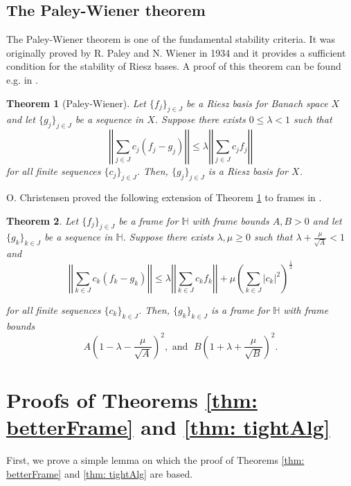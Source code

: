 \documentclass[11pt, reqno]{amsart}
\newcommand{\norm}[1]{\left|\left| #1 \right|\right|}
\newtheorem{theorem}{Theorem}[section]
\numberwithin{equation}{section}
\begin{document}
\subsection{The Paley-Wiener theorem} 

The Paley-Wiener theorem is one of the fundamental stability criteria. It was originally proved by R. Paley and N. Wiener in 1934 and it provides a sufficient condition for the stability of Riesz bases. A proof of this theorem can be found e.g. in \cite[Theorem 10]{Young}.

\begin{theorem}[Paley-Wiener]\label{thm:PWclassically}
    Let $\{f_j\}_{j \in J}$ be a Riesz basis for Banach space $X$ and let $\{g_j\}_{j \in J}$ be a sequence in $X$. Suppose there exists $0\le \lambda<1$ such that \begin{equation}
        \norm{\sum_{j \in J}c_j(f_j-g_j)}\le \lambda\norm{\sum_{j \in J}c_jf_j}
    \end{equation}
    for all finite sequences $\{c_j\}_{j \in J}$. Then, $\{g_j\}_{j \in J}$ is a Riesz basis for $X$.
\end{theorem}


\noindent O. Christensen proved the following extension of Theorem \ref{thm:PWclassically} to frames in \cite{Christensen}.
\begin{theorem}\label{thm: Paley-Wiener}
    Let $\{f_j\}_{j \in J}$ be a frame for $\mathbb{H}$ with frame bounds $A, B>0$ and let $\{g_k\}_{k \in J}$ be a sequence in $\mathbb{H}$. Suppose there exists $\lambda, \mu\ge 0$ such that $\lambda+\frac{\mu}{\sqrt{A}}<1$ and \begin{equation}\label{eq: PWIneq}
        \norm{\sum_{k \in J}c_k(f_k-g_k)}\le \lambda\norm{\sum_{k \in J}c_kf_k}+\mu\left(\sum_{k \in J}|c_k|^2\right)^{\frac{1}{2}}
    \end{equation}

    for all finite sequences $\{c_k\}_{k \in J}$. Then, $\{g_k\}_{k \in J}$ is a frame for $\mathbb{H}$ with frame bounds $$A\left(1-\lambda-\frac{\mu}{\sqrt{A}}\right)^2, \text{ and } \; B\left(1+\lambda+\frac{\mu}{\sqrt{B}}\right)^2.$$ 

\end{theorem}


\section{Proofs of Theorems \ref{thm: betterFrame} and \ref{thm: tightAlg}}
First, we prove a simple lemma on which the proof of Theorems \ref{thm: betterFrame} and \ref{thm: tightAlg} are based. 
  
\end{document}
